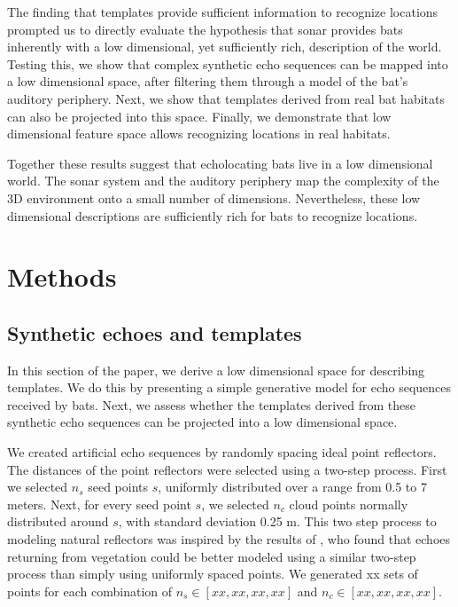 \documentclass[preprint,5p]{elsarticle}
\begin{document}
The finding that templates provide sufficient information to recognize locations prompted us to directly evaluate the hypothesis that sonar provides bats inherently with a low dimensional, yet sufficiently rich, description of the world. Testing this, we show that complex synthetic echo sequences can be mapped into a low dimensional space, after filtering them through a model of the bat's auditory periphery. Next, we show that templates derived from real bat habitats can also be projected into this space. Finally, we demonstrate that low dimensional feature space allows recognizing locations in real habitats. 

Together these results suggest that echolocating bats live in a low dimensional world. The sonar system and the auditory periphery map the complexity of the 3D environment onto a small number of dimensions. Nevertheless, these low dimensional descriptions are sufficiently rich for bats to recognize locations.

\section{Methods}

\subsection{Synthetic echoes and templates}

In this section of the paper, we derive a low dimensional space for describing templates. We do this by presenting a simple generative model for echo sequences received by bats. Next, we assess whether the templates derived from these synthetic echo sequences can be projected into a low dimensional space. 

We created artificial echo sequences by randomly spacing ideal point reflectors. The distances of the point reflectors were selected using a two-step process. First we selected $n_{s}$ seed points $s$, uniformly distributed over a range from 0.5 to 7 meters. Next, for every seed point $s$, we selected $n_{c}$ cloud points normally distributed around $s$, with standard deviation 0.25 m. This two step process to modeling natural reflectors was inspired by the results of \citet{Yovel2009}, who found that echoes returning from vegetation could be better modeled using a similar two-step process than simply using uniformly spaced points. We generated xx sets of points for each combination of $n_s \in [xx,xx,xx, xx]$ and $n_c \in [xx, xx, xx, xx]$.
\end{document}
